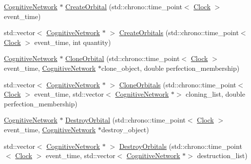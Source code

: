 \begin{DoxyCompactItemize}
\item 
\mbox{\hyperlink{class_cognitive_network}{Cognitive\+Network}} $\ast$ \mbox{\hyperlink{class_cognitive_network_a5e0a782afc45d75d57fef91dd5513546}{Create\+Orbital}} (std\+::chrono\+::time\+\_\+point$<$ \mbox{\hyperlink{universe_8h_a0ef8d951d1ca5ab3cfaf7ab4c7a6fd80}{Clock}} $>$ event\+\_\+time)
\item 
std\+::vector$<$ \mbox{\hyperlink{class_cognitive_network}{Cognitive\+Network}} $\ast$ $>$ \mbox{\hyperlink{class_cognitive_network_a46d4189cf3e6b9af6190abe7b79539b4}{Create\+Orbitals}} (std\+::chrono\+::time\+\_\+point$<$ \mbox{\hyperlink{universe_8h_a0ef8d951d1ca5ab3cfaf7ab4c7a6fd80}{Clock}} $>$ event\+\_\+time, int quantity)
\item 
\mbox{\hyperlink{class_cognitive_network}{Cognitive\+Network}} $\ast$ \mbox{\hyperlink{class_cognitive_network_aa8992740f25d46b0be3d9d8344c39f67}{Clone\+Orbital}} (std\+::chrono\+::time\+\_\+point$<$ \mbox{\hyperlink{universe_8h_a0ef8d951d1ca5ab3cfaf7ab4c7a6fd80}{Clock}} $>$ event\+\_\+time, \mbox{\hyperlink{class_cognitive_network}{Cognitive\+Network}} $\ast$clone\+\_\+object, double perfection\+\_\+membership)
\item 
std\+::vector$<$ \mbox{\hyperlink{class_cognitive_network}{Cognitive\+Network}} $\ast$ $>$ \mbox{\hyperlink{class_cognitive_network_a266b7baf2fd9d6b5c5652e251830020a}{Clone\+Orbitals}} (std\+::chrono\+::time\+\_\+point$<$ \mbox{\hyperlink{universe_8h_a0ef8d951d1ca5ab3cfaf7ab4c7a6fd80}{Clock}} $>$ event\+\_\+time, std\+::vector$<$ \mbox{\hyperlink{class_cognitive_network}{Cognitive\+Network}} $\ast$$>$ cloning\+\_\+list, double perfection\+\_\+membership)
\item 
\mbox{\hyperlink{class_cognitive_network}{Cognitive\+Network}} $\ast$ \mbox{\hyperlink{class_cognitive_network_aefecb3a2464f7f21449e522af5119c63}{Destroy\+Orbital}} (std\+::chrono\+::time\+\_\+point$<$ \mbox{\hyperlink{universe_8h_a0ef8d951d1ca5ab3cfaf7ab4c7a6fd80}{Clock}} $>$ event\+\_\+time, \mbox{\hyperlink{class_cognitive_network}{Cognitive\+Network}} $\ast$destroy\+\_\+object)
\item 
std\+::vector$<$ \mbox{\hyperlink{class_cognitive_network}{Cognitive\+Network}} $\ast$ $>$ \mbox{\hyperlink{class_cognitive_network_a0ee8259d26e30779bf06471fb8a10bb5}{Destroy\+Orbitals}} (std\+::chrono\+::time\+\_\+point$<$ \mbox{\hyperlink{universe_8h_a0ef8d951d1ca5ab3cfaf7ab4c7a6fd80}{Clock}} $>$ event\+\_\+time, std\+::vector$<$ \mbox{\hyperlink{class_cognitive_network}{Cognitive\+Network}} $\ast$$>$ destruction\+\_\+list)
\item 

\end{DoxyCompactItemize}
